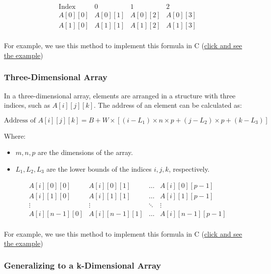 \documentclass{book}
\begin{document}
\[
\begin{array}{c|c|c|c}
	\text{Index} & 0 & 1 & 2 \\
	\hline
	A[0][0] & A[0][1] & A[0][2] & A[0][3] \\
	\hline
	A[1][0] & A[1][1] & A[1][2] & A[1][3] \\
\end{array}
\]

For example, we use this method to implement this formula in C (\href{https://github.com/m-mdy-m/Arliz/blob/main/AddressCalculation/Two-Dimensional.c}{click and see the example})

\subsubsection{Three-Dimensional Array}

In a three-dimensional array, elements are arranged in a structure with three indices, such as \( A[i][j][k] \). The address of an element can be calculated as:

\[
\text{Address of } A[i][j][k] = B + W \times \left[ (i - L_1) \times n \times p + (j - L_2) \times p + (k - L_3) \right]
\]

Where:
\begin{itemize}
	\item \( m, n, p \) are the dimensions of the array.
	\item \( L_1, L_2, L_3 \) are the lower bounds of the indices \( i, j, k \), respectively.
\end{itemize}

\[
\begin{array}{c|c|c|c}
	A[i][0][0] & A[i][0][1] & \dots & A[i][0][p-1] \\
	\hline
	A[i][1][0] & A[i][1][1] & \dots & A[i][1][p-1] \\
	\hline
	\vdots & \vdots & \ddots & \vdots \\
	\hline
	A[i][n-1][0] & A[i][n-1][1] & \dots & A[i][n-1][p-1] \\
\end{array}
\]

For example, we use this method to implement this formula in C (\href{https://github.com/m-mdy-m/Arliz/blob/main/AddressCalculation/Three-Dimensional.c}{click and see the example})

\subsubsection{Generalizing to a k-Dimensional Array}
\end{document}
